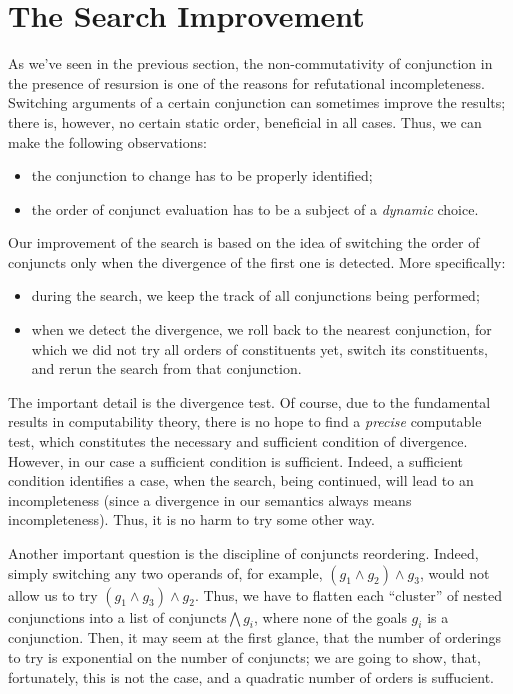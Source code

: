 \section{The Search Improvement}
\label{improvement}

As we've seen in the previous section, the non-commutativity of conjunction in the presence of resursion
is one of the reasons for refutational incompleteness. Switching arguments of a certain conjunction
can sometimes improve the results; there is, however, no certain static order, beneficial in all cases.
Thus, we can make the following observations:

\begin{itemize}
\item the conjunction to change has to be properly identified;
\item the order of conjunct evaluation has to be a subject of a \emph{dynamic} choice.
\end{itemize}

Our improvement of the search is based on the idea of switching the order of conjuncts only when
the divergence of the first one is detected. More specifically: 

\begin{itemize}
\item during the search, we keep the track of all conjunctions being performed;
\item when we detect the divergence, we roll back to the nearest conjunction, for which 
we did not try all orders of constituents yet, switch its constituents, and rerun 
the search from that conjunction.
\end{itemize}

The important detail is the divergence test. Of course, due to the fundamental results in computability
theory, there is no hope to find a \emph{precise} computable test, which constitutes the necessary and 
sufficient condition of divergence. However, in our case a sufficient condition is sufficient. Indeed,  
a sufficient condition identifies a case, when the search, being continued, will lead to an incompleteness 
(since a divergence in our semantics always means incompleteness). Thus, it is no harm to try some other way. 

Another important question is the discipline of conjuncts reordering. Indeed, simply switching any two operands
of, for example, \mbox{$(g_1\wedge g_2)\wedge g_3$}, would not allow us to try \mbox{$(g_1\wedge g_3)\wedge g_2$}.
Thus, we have to flatten each ``cluster'' of nested conjunctions into a list of conjuncts\mbox{$\bigwedge g_i$}, 
where none of the goals $g_i$ is a conjunction. Then, it may seem at the first glance, that the number of orderings to try 
is exponential on the number of conjuncts; we are going to show, that, fortunately, this is not the case, and
a quadratic number of orders is suffucient.

